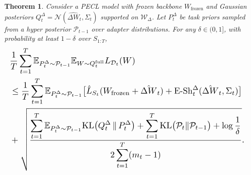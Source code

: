 \documentclass{article}
\theoremstyle{plain}
\newtheorem{theorem}{Theorem}[section]
\theoremstyle{definition}
\theoremstyle{remark}
\begin{document}
\begin{theorem}
\label{thm:pecl-bound}
Consider a PECL model with frozen backbone $W_{\mathrm{frozen}}$ and Gaussian posteriors 
$Q_t^\Delta = \mathcal N(\hat{\Delta W}_t,\Sigma_t)$ supported on $\mathcal W_\Delta$. 
Let $P_t^\Delta$ be task priors sampled from a hyper posterior $\mathcal P_{t-1}$ over adapter 
distributions. For any $\delta\in(0,1]$, with probability at least $1-\delta$ over $S_{1:T}$,
\begin{equation*}
\label{eq:pecl-main-bound}
\resizebox{\linewidth}{!}{$
\begin{aligned}
&\frac{1}{T}\sum_{t=1}^T
\mathbb E_{P_t^\Delta\sim\mathcal P_{t-1}}
\mathbb E_{W\sim Q_t^{\mathrm{full}}}
L_{\mathcal D_t}(W) \\
&\le
\frac{1}{T}\sum_{t=1}^T
\mathbb E_{P_t^\Delta\sim\mathcal P_{t-1}}
\bigl[
\hat L_{S_t}(W_{\mathrm{frozen}} + \hat{\Delta W}_t)
+
\mathrm{E\text{-}Sh}_t^\Delta(\hat{\Delta W}_t,\Sigma_t)
\bigr] \\
&+
\sqrt{
\frac{
\displaystyle
\sum_{t=1}^T
\mathbb E_{P_t^\Delta\sim\mathcal P_{t-1}}
\mathrm{KL}\bigl(Q_t^\Delta \,\Vert\, P_t^\Delta\bigr)
+
\sum_{t=1}^T
\mathrm{KL}\bigl(\mathcal P_t\Vert\mathcal P_{t-1}\bigr)
+
\log\frac{1}{\delta}}
{2\displaystyle\sum_{t=1}^T (m_t - 1)}
}.
\end{aligned}
$}
\end{equation*}
\end{theorem}

\end{document}
